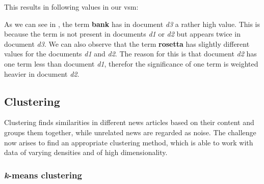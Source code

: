 This results in following values in our \Gls{vsm}:

\begin{table}[h]
    \centering
    \caption{tf-idf \Gls{vsm}.}
    \label{tab:tfidf_vsm}
\end{table}

As we can see in , the term \textbf{bank} has in document \textit{d3}
a rather high value.
This is because the term is not present in documents \textit{d1} or \textit{d2} but appears
twice in document \textit{d3}.
We can also observe that the term \textbf{rosetta} has slightly different values for the
documents \textit{d1} and \textit{d2}.
The reason for this is that document \textit{d2} has one term less than document \textit{d1},
therefor the significance of one term is weighted heavier in document \textit{d2}.

\subsection{Clustering}
\label{subsec:3_clustering}

Clustering finds similarities in different news articles based on their content and groups them together,
while unrelated news are regarded as noise.
The challenge now arises to find an appropriate clustering method,
which is able to work with data of varying densities and of high dimensionality.

\subsubsection{\textit{k}-means clustering}
\label{subsubsec:3_kmeans_clustering}

